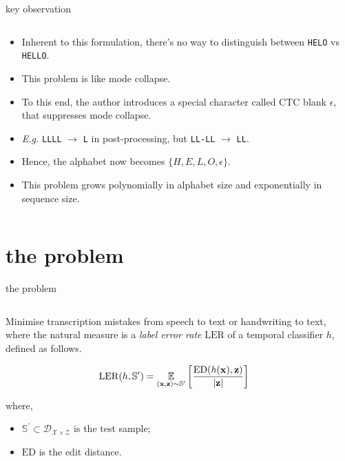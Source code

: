 \documentclass[aspectratio=169,xcolor={dvipsnames,svgnames}]{beamer}
\begin{document}
\begin{frame}[label={sec:org0b7b8bd},fragile]{key observation}
 \begin{columns}
\begin{column}{.7\columnwidth}
\begin{itemize}
\item Inherent to this formulation, there’s no way to
distinguish between \texttt{HELO} vs \texttt{HELLO}.
\item This problem is like \alert{mode collapse}.
\item To this end, the author introduces a special
character called CTC blank \(\epsilon\), that
suppresses mode collapse.
\item \emph{E.g.} \texttt{LLLL} \(\to\) \texttt{L} in post-processing, but
\texttt{LL-LL} \(\to\) \texttt{LL}.
\item Hence, the alphabet now becomes
\(\{H,E,L,O,\epsilon\}\).
\item This problem grows polynomially in alphabet size and
exponentially in sequence size.
\end{itemize}
\end{column}
\end{columns}
\end{frame}

\section{the problem}
\label{sec:org7330e3a}

\begin{frame}[label={sec:org42648f1}]{the problem}
\begin{columns}
\begin{column}{.7\columnwidth}
Minimise transcription mistakes from speech to text or
handwriting to text, where the natural measure is a
\emph{label error rate} \(\mathrm{LER}\) of a temporal
classifier \(h\), defined as follows.

\begin{align}
  \notag
  \mathrm{LER}(h,\mathbb{S}^{\prime})
  &= \underset {\large(\mathbf{x},\mathbf{z}) \sim
    \mathbb{S}^{\prime}} {\Large\mathbb{E}}
    \left[\frac{\mathrm{ED}(h(\mathbf{x}),
    \mathbf{z})}{|\mathbf{z}|} \right]
\end{align}

where,
\begin{itemize}
\item \(\mathbb{S}^{\prime}\subset \mathcal{D}_{\mathcal{X}
  \times \mathcal{Z}}\) is the test sample;
\item \(\mathrm{ED}\) is the edit distance.
\end{itemize}
\end{column}
\end{columns}
\end{frame}
\end{document}
